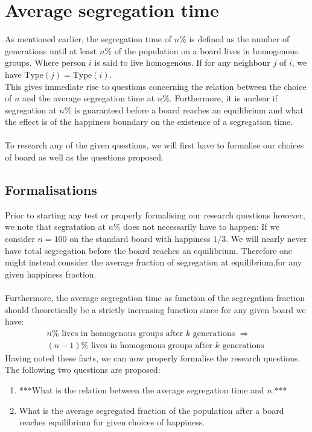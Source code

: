 \documentclass{article}
\begin{document}
\section{Average segregation time}
	As mentioned earlier, the segregation time of \(n\%\) is defined as the number of generations until at least \(n\%\) of the population on a board lives in homogenous groups. 
Where person \(i\) is said to live homogenous. If for any neighbour \(j\) of \(i\), we have \(\text{Type}(j)=\text{Type}(i)\).\\
This gives immediate rise to questions concerning the relation between the choice of \(n\) and the average segregation time at \(n\%\). 
Furthermore, it is unclear if segregation at \(n\%\) is guaranteed before a board reaches an equilibrium and what the effect is of the happiness boundary on the existence of a segregation time.\\
\\
To research any of the given questions, we will first have to formalise our choices of board as well as the questions proposed.\\


\subsection{Formalisations}
Prior to starting any test or properly formalising our research questions however, we note that segratation at \(n\%\) does not necessarily have to happen: 
If we consider \(n=100\) on the standard board with happiness \(1/3\). We will nearly never have total segregation before the board reaches an equilibrium.
Therefore one might instead consider the average fraction of segregation at equilibrium,for any given happiness fraction. \\
\\
Furthermore, the average segregation time as function of the segregation fraction should theoretically be a strictly increasing function since for any given board we have:
\begin{align*}
n\% \text{ lives in homogenous groups after } k \text{ generations } \Rightarrow\\
 (n-1)\% \text{ lives in homogenous groups after } k \text{ generations }
\end{align*} 
Having noted these facts, we can now properly formalise the research questions.\\
The following two questions are proposed:
\begin{enumerate}
 \item ***What is the relation between the average segregation time and \(n\).***
 \item What is the average segregated fraction of the population after a board reaches equilibrium for given choices of happiness.
\end{enumerate}
\end{document}
